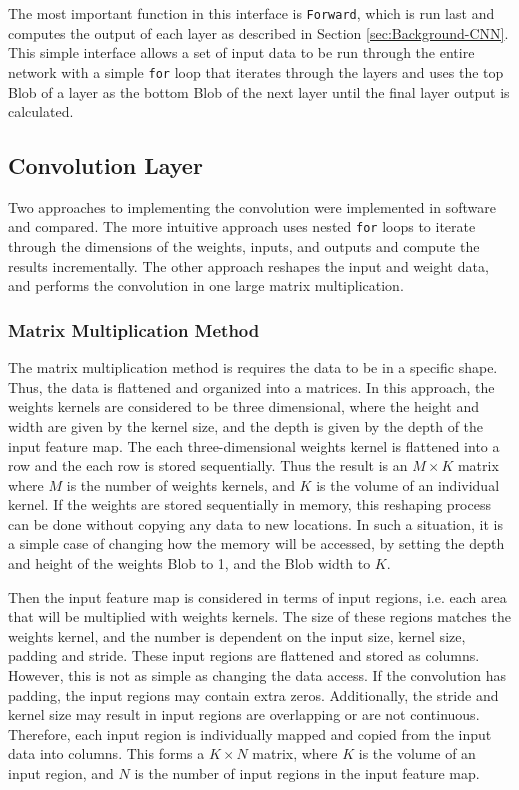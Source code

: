 \documentclass[12pt]{article}
\begin{document}
The most important function in this interface is \lstinline|Forward|, which is run last and computes the output of each layer as described in Section \ref{sec:Background-CNN}. This simple interface allows a set of input data to be run through the entire network with a simple \lstinline|for| loop that iterates through the layers and uses the top Blob of a layer as the bottom Blob of the next layer until the final layer output is calculated.

\subsection{Convolution Layer}
\label{sec:Imp-Conv}

Two approaches to implementing the convolution were implemented in software and compared. The more intuitive approach uses nested \lstinline|for| loops to iterate through the dimensions of the weights, inputs, and outputs and compute the results incrementally. The other approach reshapes the input and weight data, and performs the convolution in one large matrix multiplication. 

\subsubsection{Matrix Multiplication Method}
\label{sec:Imp-Conv-MM}

The matrix multiplication method is requires the data to be in a specific shape. Thus, the data is flattened and organized into a matrices. In this approach, the weights kernels are considered to be three dimensional, where the height and width are given by the kernel size, and the depth is given by the depth of the input feature map. The each three-dimensional weights kernel is flattened into a row and the each row is stored sequentially. Thus the result is an $M \times K$ matrix where $M$ is the number of weights kernels, and $K$ is the volume of an individual kernel. If the weights are stored sequentially in memory, this reshaping process can be done without copying any data to new locations. In such a situation, it is a simple case of changing how the memory will be accessed, by setting the depth and height of the weights Blob to 1, and the Blob width to $K$.

Then the input feature map is considered in terms of input regions, i.e. each area that will be multiplied with weights kernels. The size of these regions matches the weights kernel, and the number is dependent on the input size, kernel size, padding and stride.  These input regions are flattened and stored as columns. However, this is not as simple as changing the data access. If the convolution has padding, the input regions may contain extra zeros. Additionally, the stride and kernel size may result in input regions are overlapping or are not continuous. Therefore, each input region is individually mapped and copied from the input data into columns. This forms a $K \times N$ matrix, where $K$ is the volume of an input region, and $N$ is the number of input regions in the input feature map.
\end{document}
